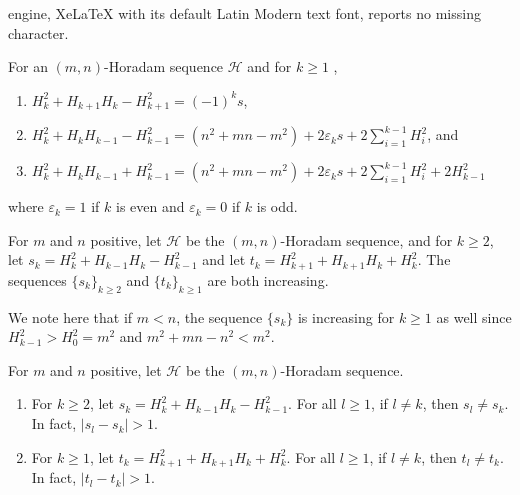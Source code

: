 \documentclass[10pt,a4paper]{amsart}
\newcommand{\ds}{\displaystyle}
\begin{document}
engine, XeLaTeX with its default Latin Modern text font, reports no missing character.
\begin{lemma}\label{lem:sloperelations}
For an $(m,n)$-Horadam sequence $\mathcal H$ and for $k \ge 1$ , 
\begin{enumerate}
\item $H_{k}^2 +H_{k+1}H_{k} - H_{k+1}^2 = (-1)^{k}s$, 
\item $\ds H_{k}^2 +H_{k}H_{k-1} - H_{k-1}^2 = (n^2+mn -m^2) + 2\varepsilon_k s  + 2\sum_{i=1}^{k-1} H_i^2$, and
\item $\ds H_{k}^2 +H_{k}H_{k-1} + H_{k-1}^2 = (n^2+mn -m^2) + 2\varepsilon_k s  + 2\sum_{i=1}^{k-1} H_i^2 + 2H_{k-1}^2$
\end{enumerate}
where $\varepsilon_k = 1$ if $k$ is even and $\varepsilon_k = 0$ if $k$ is odd.

\end{lemma}

\begin{lemma}\label{lem:increasing}
For $m$ and $n$ positive, let $\mathcal H$ be the $(m,n)$-Horadam sequence, and for $k \ge 2$, let $s_k = H_{k}^2 +H_{k-1}H_{k} - H_{k-1}^2$ and let $t_k = H_{k+1}^2 +H_{k+1}H_{k} + H_{k}^2$. The sequences $\{s_k \}_{k\ge 2}$ and $\{t_k \}_{k\ge 1}$ are both increasing. 
\end{lemma}

\begin{rem}\label{rem:extendlemma}
We note here that if $m<n$, the sequence $\{s_k\}$ is increasing for $k\ge1$ as well since $H_{k-1}^2>H_0^2 = m^2$ and $m^2+mn-n^2 < m^2$. 
\end{rem}

\begin{lemma}\label{lem:slopesaredifferent}
For $m$ and $n$ positive, let $\mathcal H$ be the $(m,n)$-Horadam sequence. 
\begin{enumerate}
\item For $k \ge 2$, let $s_k = H_{k}^2 +H_{k-1}H_{k} - H_{k-1}^2$. For all $l \ge 1$, if $l\neq k$, then $s_l\neq s_k$. In fact, $|s_l - s_k|>1$.
\item For $k \ge 1$, let $t_k = H_{k+1}^2 +H_{k+1}H_{k} + H_{k}^2$. For all $l \ge 1$, if $l\neq k$, then $t_l\neq t_k$. In fact, $|t_l - t_k|>1$.
\end{enumerate}
\end{lemma}
\end{document}
